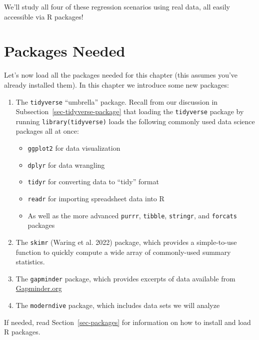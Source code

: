 \documentclass[
  letterpaper,
  DIV=11,
  numbers=noendperiod]{scrreprt}
\providecommand{\tightlist}{%
  \setlength{\itemsep}{0pt}\setlength{\parskip}{0pt}}\usepackage{longtable,booktabs,array}
\theoremstyle{definition}
\theoremstyle{remark}
\begin{document}
We'll study all four of these regression scenarios using real data, all
easily accessible via R packages!

\hypertarget{packages-needed-3}{%
\section*{Packages Needed}\label{packages-needed-3}}


Let's now load all the packages needed for this chapter (this assumes
you've already installed them). In this chapter we introduce some new
packages:

\begin{enumerate}
\def\labelenumi{\arabic{enumi}.}
\item
  The \texttt{tidyverse} ``umbrella'' package. Recall from our
  discussion in Subsection~\ref{sec-tidyverse-package} that loading the
  \texttt{tidyverse} package by running \texttt{library(tidyverse)}
  loads the following commonly used data science packages all at once:

  \begin{itemize}
  \tightlist
  \item
    \texttt{ggplot2} for data visualization
  \item
    \texttt{dplyr} for data wrangling
  \item
    \texttt{tidyr} for converting data to ``tidy'' format
  \item
    \texttt{readr} for importing spreadsheet data into R
  \item
    As well as the more advanced \texttt{purrr}, \texttt{tibble},
    \texttt{stringr}, and \texttt{forcats} packages
  \end{itemize}
\item
  The \texttt{skimr} (Waring et al. 2022) package, which provides a
  simple-to-use function to quickly compute a wide array of
  commonly-used summary statistics.
\item
  The \texttt{gapminder} package, which provides excerpts of data
  available from \href{https://gapminder.org}{Gapminder.org}
\item
  The \texttt{moderndive} package, which includes data sets we will
  analyze
\end{enumerate}

If needed, read Section~\ref{sec-packages} for information on how to
install and load R packages.
\end{document}
